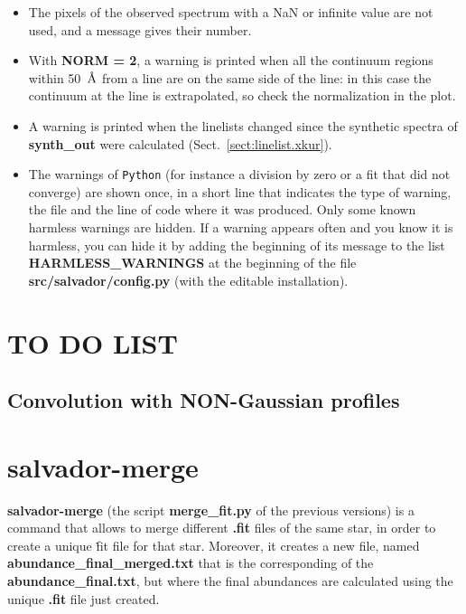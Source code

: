 \documentclass[modern]{aastex701}
\newcommand{\angstrom}{\mbox{\normalfont\AA}}
\begin{document}
\begin{itemize}
    \item The pixels of the observed spectrum with a NaN or infinite value are not used, and a message gives their number.
    \item With {\bf NORM = 2}, a warning is printed when all the continuum regions within 50~$\angstrom$ from a line are on the same side of the line: in this case the continuum at the line is extrapolated, so check the normalization in the plot.
    \item A warning is printed when the linelists changed since the synthetic spectra of {\bf synth\_out} were calculated (Sect.~\ref{sect:linelist.xkur}).
    \item The warnings of \texttt{Python} (for instance a division by zero or a fit that did not converge) are shown once, in a short line that indicates the type of warning, the file and the line of code where it was produced. Only some known harmless warnings are hidden. If a warning appears often and you know it is harmless, you can hide it by adding the beginning of its message to the list {\bf HARMLESS\_WARNINGS} at the beginning of the file {\bf src/salvador/config.py} (with the editable installation).
\end{itemize}

\section{TO DO LIST}
\subsection{Convolution with NON-Gaussian profiles}


{}


\appendix
\section{{\bf salvador-merge}} \label{appendix_b}
{\bf salvador-merge} (the script {\bf merge\_fit.py} of the previous versions) is a command that allows to merge different {\bf .fit} files of the same star, in order to create a unique {\.fit} file for that star. Moreover, it creates a new file, named {\bf abundance\_final\_merged.txt} that is the corresponding of the {\bf abundance\_final.txt}, but where the final abundances are calculated using the unique {\bf .fit} file just created. 
\end{document}
